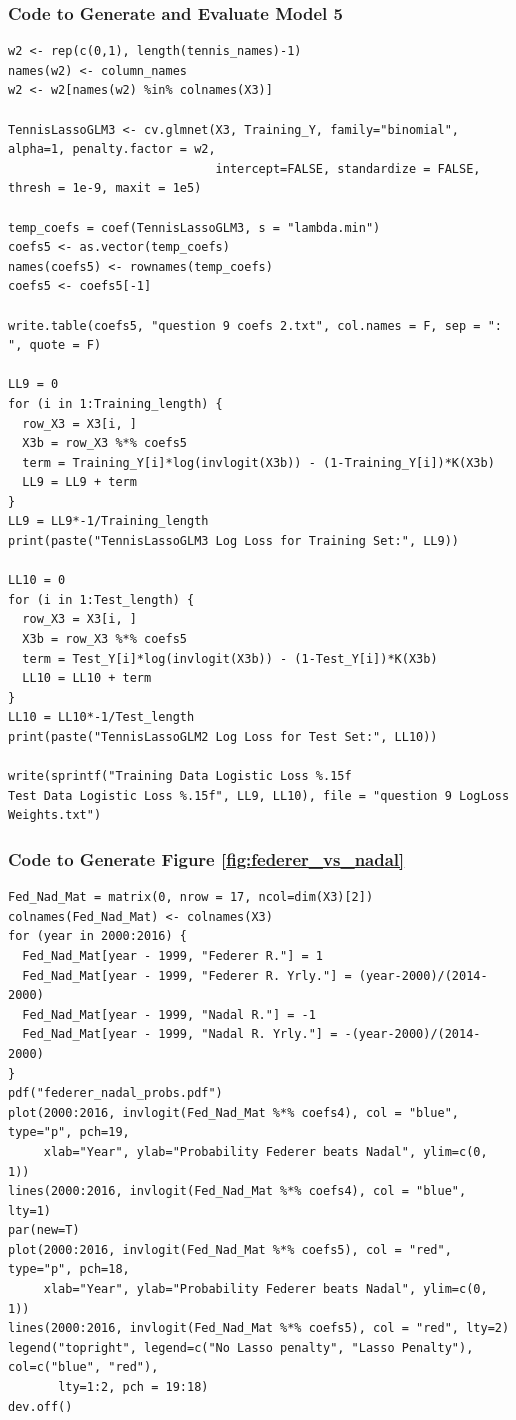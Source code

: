 \documentclass[11pt]{article} %
\begin{document}
\subsubsection*{Code to Generate and Evaluate Model 5}
\begin{lstlisting}
w2 <- rep(c(0,1), length(tennis_names)-1)
names(w2) <- column_names
w2 <- w2[names(w2) %in% colnames(X3)]

TennisLassoGLM3 <- cv.glmnet(X3, Training_Y, family="binomial", alpha=1, penalty.factor = w2, 
                             intercept=FALSE, standardize = FALSE, thresh = 1e-9, maxit = 1e5)

temp_coefs = coef(TennisLassoGLM3, s = "lambda.min")
coefs5 <- as.vector(temp_coefs)
names(coefs5) <- rownames(temp_coefs)
coefs5 <- coefs5[-1]

write.table(coefs5, "question 9 coefs 2.txt", col.names = F, sep = ": ", quote = F)

LL9 = 0
for (i in 1:Training_length) {
  row_X3 = X3[i, ]
  X3b = row_X3 %*% coefs5
  term = Training_Y[i]*log(invlogit(X3b)) - (1-Training_Y[i])*K(X3b)
  LL9 = LL9 + term
}
LL9 = LL9*-1/Training_length
print(paste("TennisLassoGLM3 Log Loss for Training Set:", LL9))

LL10 = 0
for (i in 1:Test_length) {
  row_X3 = X3[i, ]
  X3b = row_X3 %*% coefs5
  term = Test_Y[i]*log(invlogit(X3b)) - (1-Test_Y[i])*K(X3b)
  LL10 = LL10 + term
}
LL10 = LL10*-1/Test_length
print(paste("TennisLassoGLM2 Log Loss for Test Set:", LL10))

write(sprintf("Training Data Logistic Loss %.15f
Test Data Logistic Loss %.15f", LL9, LL10), file = "question 9 LogLoss Weights.txt")
\end{lstlisting}
\subsubsection*{Code to Generate Figure \ref{fig:federer_vs_nadal}}
\begin{lstlisting}
Fed_Nad_Mat = matrix(0, nrow = 17, ncol=dim(X3)[2])
colnames(Fed_Nad_Mat) <- colnames(X3)
for (year in 2000:2016) {
  Fed_Nad_Mat[year - 1999, "Federer R."] = 1
  Fed_Nad_Mat[year - 1999, "Federer R. Yrly."] = (year-2000)/(2014-2000)
  Fed_Nad_Mat[year - 1999, "Nadal R."] = -1
  Fed_Nad_Mat[year - 1999, "Nadal R. Yrly."] = -(year-2000)/(2014-2000)
}
pdf("federer_nadal_probs.pdf")
plot(2000:2016, invlogit(Fed_Nad_Mat %*% coefs4), col = "blue", type="p", pch=19,
     xlab="Year", ylab="Probability Federer beats Nadal", ylim=c(0, 1))
lines(2000:2016, invlogit(Fed_Nad_Mat %*% coefs4), col = "blue", lty=1)
par(new=T)
plot(2000:2016, invlogit(Fed_Nad_Mat %*% coefs5), col = "red", type="p", pch=18,
     xlab="Year", ylab="Probability Federer beats Nadal", ylim=c(0, 1))
lines(2000:2016, invlogit(Fed_Nad_Mat %*% coefs5), col = "red", lty=2)
legend("topright", legend=c("No Lasso penalty", "Lasso Penalty"), col=c("blue", "red"),
       lty=1:2, pch = 19:18)
dev.off()
\end{lstlisting}
\end{document}
